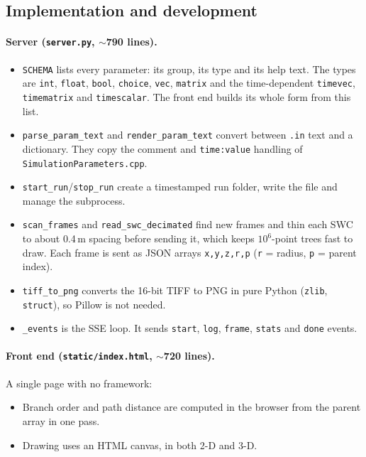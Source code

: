 \documentclass[11pt,a4paper]{article}
\newcommand{\code}[1]{\texttt{#1}}
\begin{document}
\subsection{Implementation and development}
\paragraph{Server (\code{server.py}, $\sim$790 lines).}
\begin{itemize}
  \item \code{SCHEMA} lists every parameter: its group, its type and its help text. The types are \code{int}, \code{float}, \code{bool}, \code{choice}, \code{vec}, \code{matrix} and the time-dependent \code{timevec}, \code{timematrix} and \code{timescalar}. The front end builds its whole form from this list.
  \item \code{parse\_param\_text} and \code{render\_param\_text} convert between \code{.in} text and a dictionary. They copy the comment and \code{time:value} handling of \code{SimulationParameters.cpp}.
  \item \code{start\_run}/\code{stop\_run} create a timestamped run folder, write the file and manage the subprocess.
  \item \code{scan\_frames} and \code{read\_swc\_decimated} find new frames and thin each SWC to about 0.4\,\textmu m spacing before sending it, which keeps $10^6$-point trees fast to draw. Each frame is sent as JSON arrays \code{x,y,z,r,p} (\code{r} = radius, \code{p} = parent index).
  \item \code{tiff\_to\_png} converts the 16-bit TIFF to PNG in pure Python (\code{zlib}, \code{struct}), so Pillow is not needed.
  \item \code{\_events} is the SSE loop. It sends \code{start}, \code{log}, \code{frame}, \code{stats} and \code{done} events.
\end{itemize}

\paragraph{Front end (\code{static/index.html}, $\sim$720 lines).}
A single page with no framework:
\begin{itemize}
  \item Branch order and path distance are computed in the browser from the parent array in one pass.
  \item Drawing uses an HTML canvas, in both 2-D and 3-D.
\end{itemize}
\end{document}
